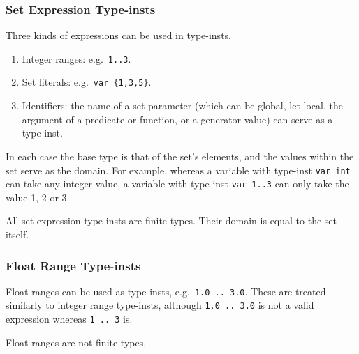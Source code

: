 \documentclass[10pt]{scrartcl}
\begin{document}
\subsubsection{Set Expression Type-insts}
        \label{Set Expression Type-insts}
Three kinds of expressions can be used in type-insts.
\begin{enumerate}
\item Integer ranges:  e.g.~\texttt{1..3}.
\item Set literals:  e.g.~\texttt{var \{1,3,5\}}.
\item Identifiers:  the name of a set parameter (which can be global,
      let-local, the argument of a predicate or function, or a generator
      value) can serve as a type-inst.
\end{enumerate}
In each case the base type is that of the set's elements, and the values
within the set serve as the domain.  For example, whereas a variable with
type-inst \texttt{var int} can take any integer value, a variable with
type-inst \texttt{var 1..3} can only take the value 1, 2 or 3.

All set expression type-insts are finite types.  Their domain is equal to
the set itself.

\subsubsection{Float Range Type-insts}
Float ranges can be used as type-insts, e.g.~\verb+1.0 .. 3.0+.  These are
treated similarly to integer range type-insts, although \verb+1.0 .. 3.0+ is
not a valid expression whereas \verb+1 .. 3+ is.

Float ranges are not finite types.
\end{document}
